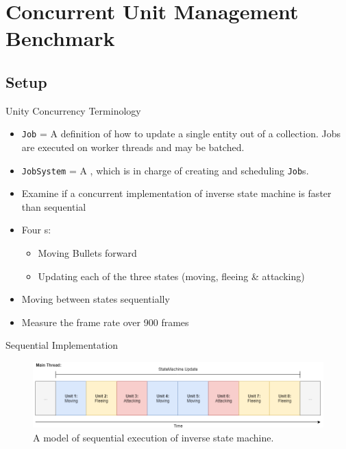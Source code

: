 \section{Concurrent Unit Management Benchmark}
\subsection{Setup}
\begin{frame}{\secname}{\subsecname}
	Unity Concurrency Terminology
	\begin{itemize}
		\item \texttt{Job} = A definition of how to update a single entity out of a collection. Jobs are executed on worker threads and may be batched.
		\item \texttt{JobSystem} = A , which is in charge of creating and scheduling \texttt{Job}s.
	\end{itemize}
\end{frame}

\begin{frame}{\secname}{\subsecname}
	\begin{itemize}
		\item Examine if a concurrent implementation of inverse state machine is faster than sequential
		\item Four s:
		\begin{itemize}
			\item Moving Bullets forward
			\item Updating each of the three states (moving, fleeing \& attacking)
		\end{itemize}
		\item Moving between states sequentially
		\item Measure the frame rate over 900 frames
	\end{itemize}
\end{frame}

\begin{frame}{\secname}{\subsecname}
	Sequential Implementation
	\begin{figure}[h!]
        \centering
        \includegraphics[width=\textwidth]{pictures/sequential.png}
        \caption{A model of sequential execution of inverse state machine.}
    \end{figure}
\end{frame}

